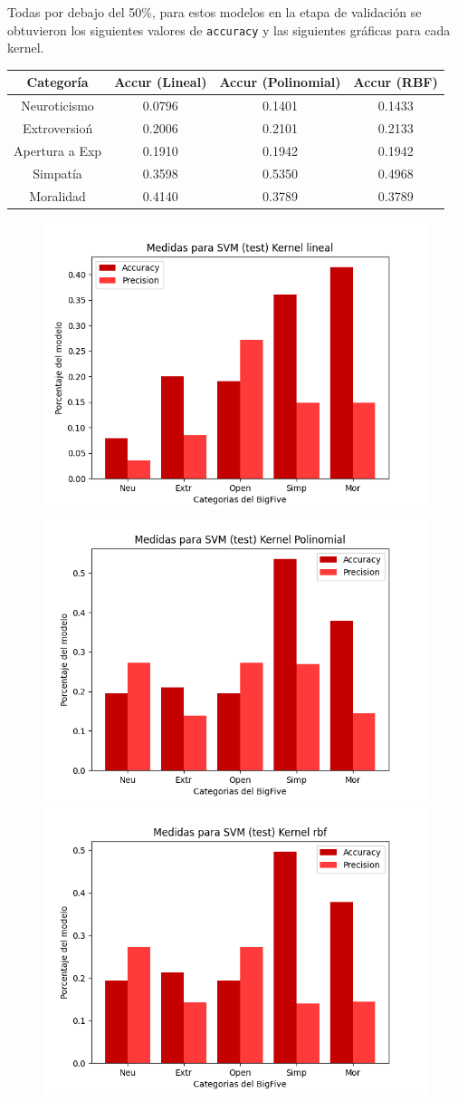 \documentclass[10pt, a4paper]{article}
\begin{document}
            Todas por debajo del 50\%, para estos modelos en la etapa de validaci\'on se obtuvieron los 
            siguientes valores de \texttt{accuracy} y las siguientes gr\'aficas para cada kernel. \\ 

            \begin{tabular}[h!]{|c|c|c|c|}

                \hline Categor\'ia & Accur (Lineal) & Accur (Polinomial) & Accur (RBF) \\  
                \hline Neuroticismo             & 0.0796 & 0.1401  &  0.1433\\
                \hline Extroversio\'n           & 0.2006 & 0.2101  &  0.2133\\
                \hline Apertura a Exp  & 0.1910 & 0.1942  &  0.1942\\
                \hline Simpat\'ia               & 0.3598 & 0.5350  &  0.4968\\
                \hline Moralidad                & 0.4140 & 0.3789  &  0.3789\\
                \hline
            \end{tabular}

            \begin{figure}[h!]
                \centering
                \includegraphics[width = 0.3\linewidth]{final_lineal10.png}
                \includegraphics[width = 0.3\linewidth]{final_polinomial10.png}
                \includegraphics[width = 0.3\linewidth]{final_rbf10.png}

            \end{figure}
\end{document}
